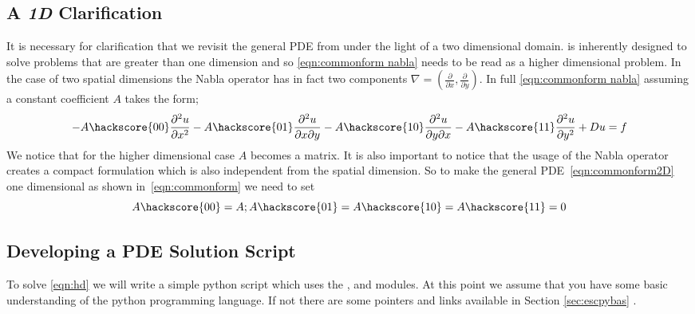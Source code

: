 \subsection{A \textit{1D} Clarification}
It is necessary for clarification that we revisit the general PDE from  under the light of a two dimensional domain. \ESCRIPT is inherently designed to solve problems that are greater than one dimension and so \ref{eqn:commonform nabla} needs to be read as a higher dimensional problem. In the case of two spatial dimensions the Nabla operator has in fact two components $\nabla = (\frac{\partial}{\partial x}, \frac{\partial}{\partial y})$. In full \ref{eqn:commonform nabla} assuming a constant coefficient $A$ takes the form;
\begin{equation}\label{eqn:commonform2D}
-A\hackscore{00}\frac{\partial^{2}u}{\partial x^{2}} 
-A\hackscore{01}\frac{\partial^{2}u}{\partial x\partial y} 
-A\hackscore{10}\frac{\partial^{2}u}{\partial y\partial x} 
-A\hackscore{11}\frac{\partial^{2}u}{\partial y^{2}} 
+ Du = f
\end{equation}
We notice that for the higher dimensional case $A$ becomes a matrix. It is also
important to notice that the usage of the Nabla operator creates
a compact formulation which is also independent from the spatial dimension. 
So to make the general PDE~\ref{eqn:commonform2D} one dimensional as
shown in~\ref{eqn:commonform} we need to set
\begin{equation}\label{eqn:commonform2D}
A\hackscore{00}=A; A\hackscore{01}=A\hackscore{10}=A\hackscore{11}=0
\end{equation}

\subsection{Developing a PDE Solution Script}
To solve \ref{eqn:hd} we will write a simple python script which uses the \modescript, \modfinley and \modmpl modules. At this point we assume that you have some basic understanding of the python programming language. If not there are some pointers and links available in Section \ref{sec:escpybas} .

